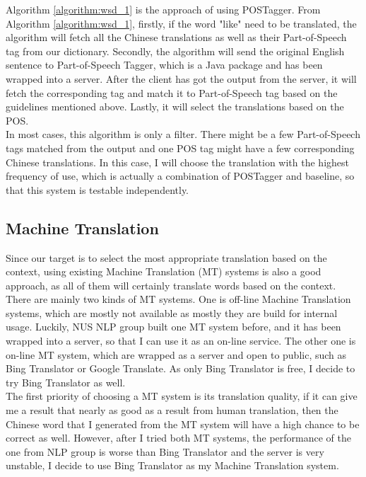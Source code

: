 Algorithm \ref{algorithm:wsd_1} is the approach of using POSTagger. From Algorithm  \ref{algorithm:wsd_1}, firstly, if the word "like" need to be translated, the algorithm will fetch all the Chinese translations as well as their Part-of-Speech tag from our dictionary. Secondly, the algorithm will send the original English sentence to Part-of-Speech Tagger, which is a Java package and has been wrapped into a server. After the client has got the output from the server, it will fetch the corresponding tag and match it to Part-of-Speech tag based on the guidelines mentioned above. Lastly, it will select the translations based on the POS.
\\
In most cases, this algorithm is only a filter. There might be a few Part-of-Speech tags matched from the output and one POS tag might have a few corresponding Chinese translations. In this case, I will choose the translation with the highest frequency of use, which is actually a combination of POSTagger and baseline, so that this system is testable independently.



\subsection{Machine Translation}
Since our target is to select the most appropriate translation based on the context, using existing Machine Translation (MT) systems is also a good approach, as all of them will certainly translate words based on the context.
\\
There are mainly two kinds of MT systems. One is off-line Machine Translation systems, which are mostly not available as mostly they are build for internal usage. Luckily, NUS NLP group built one MT system before, and it has been wrapped into a server, so that I can use it as an on-line service. The other one is on-line MT system, which are wrapped as a server and open to public, such as Bing Translator or Google Translate. As only Bing Translator is free, I decide to try Bing Translator as well.
\\
The first priority of choosing a MT system is its translation quality, if it can give me a result that nearly as good as a result from human translation, then the Chinese word that I generated from the MT system will have a high chance to be correct as well. However, after I tried both MT systems, the performance of the one from NLP group is worse than Bing Translator and the server is very unstable, I decide to use Bing Translator as my Machine Translation system.
\\

